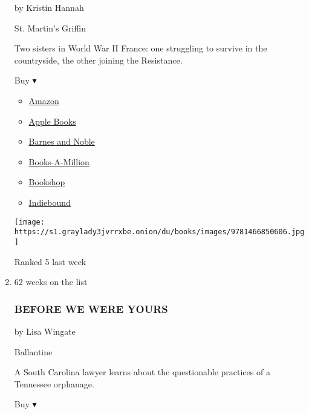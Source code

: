 \begin{enumerate}
  by Kristin Hannah

  St. Martin's Griffin

  Two sisters in World War II France: one struggling to survive in the
  countryside, the other joining the Resistance.

  Buy ▾

  \begin{itemize}
  \tightlist
  \item
    \href{http://www.amazon.com/The-Nightingale-Kristin-Hannah/dp/0312577222?tag=NYTBS-20}{Amazon}
  \item
    \href{https://du-gae-books-dot-nyt-du-prd.appspot.com/buy?title=THE+NIGHTINGALE\&author=Kristin+Hannah}{Apple
    Books}
  \item
    \href{https://www.anrdoezrs.net/click-7990613-11819508?url=https\%3A\%2F\%2Fwww.barnesandnoble.com\%2Fw\%2F\%3Fean\%3D9781250080400}{Barnes
    and Noble}
  \item
    \href{https://www.anrdoezrs.net/click-7990613-35140?url=https\%3A\%2F\%2Fwww.booksamillion.com\%2Fp\%2FTHE\%2BNIGHTINGALE\%2FKristin\%2BHannah\%2F9781250080400}{Books-A-Million}
  \item
    \href{https://bookshop.org/a/3546/9781250080400}{Bookshop}
  \item
    \href{https://www.indiebound.org/book/9781250080400?aff=NYT}{Indiebound}
  \end{itemize}

  \texttt{[image: https://s1.graylady3jvrrxbe.onion/du/books/images/9781466850606.jpg]}

  Ranked 5 last week
\item
  62 weeks on the list

  \hypertarget{before-we-were-yours}{%
  \subsubsection{BEFORE WE WERE YOURS}\label{before-we-were-yours}}

  by Lisa Wingate

  Ballantine

  A South Carolina lawyer learns about the questionable practices of a
  Tennessee orphanage.

  Buy ▾


\end{enumerate}
